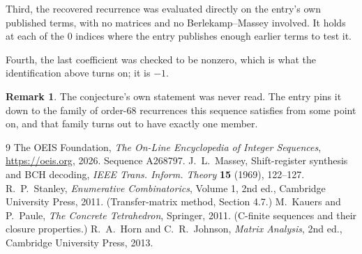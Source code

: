 \documentclass[11pt,a4paper]{article}
\theoremstyle{plain}
\theoremstyle{definition}
\newtheorem{remark}[theorem]{Remark}
\begin{document}
Third, the recovered recurrence was evaluated directly on the entry's own published terms, with
no matrices and no Berlekamp--Massey involved. It holds at each of the $0$ indices where
the entry publishes enough earlier terms to test it.

Fourth, the last coefficient was checked to be nonzero, which is what the identification above
turns on; it is $-1$.

\begin{remark}
The conjecture's own statement was never read. The entry pins it down to the family of
order-$68$ recurrences this sequence satisfies from some point on, and that family turns
out to have exactly one member.
\end{remark}

\begin{thebibliography}{9}
 The OEIS Foundation, \emph{The On-Line Encyclopedia of Integer
Sequences}, \url{https://oeis.org}, 2026. Sequence A268797.
 J.~L.~Massey, Shift-register synthesis and BCH decoding, \emph{IEEE
Trans. Inform. Theory} \textbf{15} (1969), 122--127.
 R.~P.~Stanley, \emph{Enumerative Combinatorics}, Volume 1, 2nd ed.,
Cambridge University Press, 2011. (Transfer-matrix method, Section 4.7.)
 M.~Kauers and P.~Paule, \emph{The Concrete Tetrahedron}, Springer, 2011.
(C-finite sequences and their closure properties.)
 R.~A.~Horn and C.~R.~Johnson, \emph{Matrix Analysis}, 2nd ed., Cambridge
University Press, 2013.
\end{thebibliography}
\end{document}
